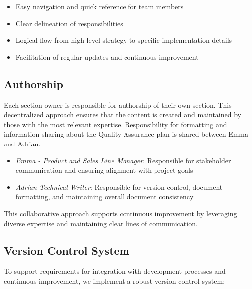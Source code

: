 \documentclass{article}
\begin{document}
\begin{itemize}
    \item Easy navigation and quick reference for team members
    \item Clear delineation of responsibilities
    \item Logical flow from high-level strategy to specific implementation details
    \item Facilitation of regular updates and continuous improvement
\end{itemize}

\subsection{Authorship}
Each section owner is responsible for authorship of their own section. This decentralized approach ensures that the content is created and maintained by those with the most relevant expertise. Responsibility for formatting and information sharing about the Quality Assurance plan is shared between Emma and Adrian:

\begin{itemize}
    \item \textit{Emma - Product and Sales Line Manager}: Responsible for stakeholder communication and ensuring alignment with project goals
    \item \textit{Adrian Technical Writer}: Responsible for version control, document formatting, and maintaining overall document consistency
\end{itemize}

This collaborative approach supports continuous improvement by leveraging diverse expertise and maintaining clear lines of communication.

\subsection{Version Control System}
To support requirements for integration with development processes and continuous improvement, we implement a robust version control system:
\end{document}
